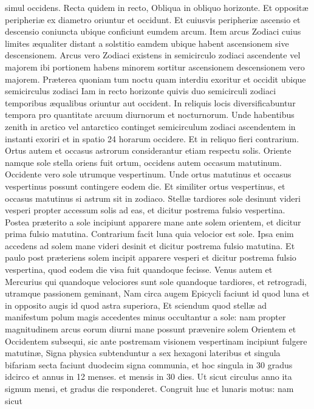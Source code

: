 \documentclass[11pt,a4paper]{article}
\begin{document}
simul occidens. Recta quidem in recto, Obliqua in obliquo horizonte. Et oppositæ peripheriæ ex diametro oriuntur et occidunt. Et cuiusvis peripheriæ ascensio et descensio coniuncta ubique conficiunt eumdem arcum. Item arcus Zodiaci cuius limites æqualiter distant a solstitio eamdem ubique habent ascensionem sive descensionem. Arcus vero Zodiaci existens in semicirculo zodiaci ascendente vel majorem ibi portionem habens minorem sortitur ascensionem descensionem vero majorem. Præterea quoniam tum noctu quam interdiu exoritur et occidit ubique semicirculus zodiaci Iam in recto horizonte quivis duo semicirculi zodiaci temporibus æqualibus oriuntur aut occident. In reliquis locis diversificabuntur tempora pro quantitate arcuum diurnorum et nocturnorum. Unde habentibus zenith in arctico vel antarctico continget semicirculum zodiaci ascendentem in instanti exoriri et in spatio 24 horarum occidere. Et in reliquo fieri contrarium. Ortus autem et occasus astrorum considerantur etiam respectu solis. Oriente namque sole stella oriens fuit ortum, occidens autem occasum matutinum.
Occidente vero sole utrumque vespertinum. Unde ortus matutinus et occasus vespertinus possunt contingere eodem die. Et similiter ortus vespertinus, et occasus matutinus si astrum sit in zodiaco. Stellæ tardiores sole desinunt videri vesperi propter accessum solis ad eas, et dicitur postrema fulsio vespertina. Postea præterito a sole incipiunt apparere mane ante solem orientem, et dicitur prima fulsio matutina. Contrarium facit luna quia velocior est sole. Ipsa enim accedens ad solem mane videri desinit et dicitur postrema fulsio matutina. Et paulo post præteriens solem incipit apparere vesperi et dicitur postrema fulsio vespertina, quod eodem die visa fuit quandoque fecisse.
Venus autem et Mercurius qui quandoque velociores sunt sole quandoque tardiores, et retrogradi, utramque passionem geminant, Nam circa augem Epicycli faciunt id quod luna et in opposito augis id quod astra superiora, Et sciendum quod stellæ ad manifestum polum magis accedentes minus occultantur a sole: nam propter magnitudinem arcus eorum diurni mane possunt prævenire solem Orientem et Occidentem subsequi, sic ante postremam visionem vespertinam incipiunt fulgere matutinæ, Signa physica subtenduntur a sex hexagoni lateribus et singula bifariam secta faciunt duodecim signa communia, et hoc singula in 30 gradus idcirco et annus in 12 menses. et mensis in 30 dies. Ut sicut circulus anno ita signum mensi, et gradus die responderet. Congruit huc et lunaris motus: nam sicut
\end{document}
